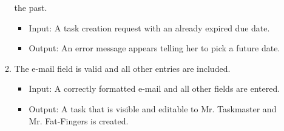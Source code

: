 \begin{enumerate}
\begin{enumerate}
the past.
            \begin{itemize}
                \item Input: A task creation request with an already expired
due date.
                \item Output: An error message appears telling her to pick a
future date.
            \end{itemize}
        \item The e-mail field is valid and all other entries are included.
            \begin{itemize}
                \item Input: A correctly formatted e-mail and all other fields
are entered.
                \item Output: A task that is visible and editable to Mr.
Taskmaster and Mr. Fat-Fingers is created.
            \end{itemize}
    \end{enumerate}
\end{enumerate}
